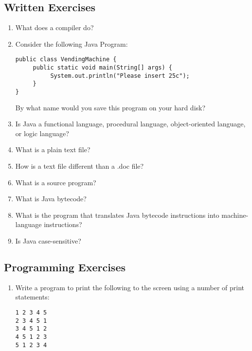 \subsection{Written Exercises}

\setcounter{counter}{1}
\begin{enumerate}[label={\arabic{counter}\addtocounter{counter}{1}}.]

\item What does a compiler do?

\item Consider the following Java Program:
\begin{lstlisting}
public class VendingMachine {
     public static void main(String[] args) {
          System.out.println("Please insert 25c");
     }
}
\end{lstlisting}
By what name would you save this program on your hard disk?

\item Is Java a functional language, procedural language, object-oriented language, or logic language?

\item What is a plain text file?

\item How is a text file different than a .doc file?

\item What is a source program?

\item What is Java bytecode?

\item What is the program that translates Java bytecode instructions into machine-language instructions?

\item Is Java case-sensitive?

\end{enumerate}

\subsection{Programming Exercises}

\setcounter{counter}{1}
\begin{enumerate}[label={\arabic{counter}\addtocounter{counter}{1}}.]
\item Write a program to print the following to the screen using a number of print statements:
\begin{verbatim}
1 2 3 4 5
2 3 4 5 1
3 4 5 1 2
4 5 1 2 3
5 1 2 3 4
\end{verbatim}
\end{enumerate}